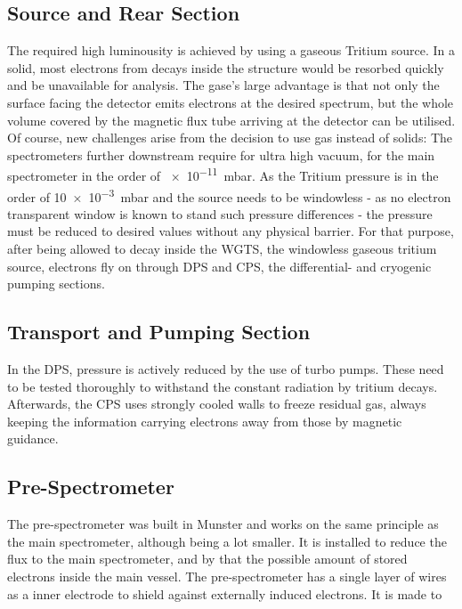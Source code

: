       \subsection{Source and Rear Section}
      \label{ch:The KATRIN experiment:sec:Experimental setup:subsec:sourceSide}
      The required high luminousity is achieved by using a gaseous Tritium source. In a solid, most electrons from decays inside the structure would be resorbed quickly and be unavailable for analysis. The gase's large advantage is that not only the surface facing the detector emits electrons at the desired spectrum, but the whole volume covered by the magnetic flux tube arriving at the detector can be utilised. Of course, new challenges arise from the decision to use gas instead of solids: The spectrometers further downstream require for ultra high vacuum, for the main spectrometer in the order of \SI{e-11}{\milli\bar}. As the Tritium pressure is in the order of \SI{10e-3}{\milli\bar} and the source needs to be windowless - as no electron transparent window is known to stand such pressure differences - the pressure must be reduced to desired values without any physical barrier. 
      For that purpose, after being allowed to decay inside the WGTS, the windowless gaseous tritium source, electrons fly on through DPS and CPS, the differential- and cryogenic pumping sections. 
      \subsection{Transport and Pumping Section}
      
      
      
      In the DPS, pressure is actively reduced by the use of turbo pumps. These need to be tested thoroughly to withstand the constant radiation by tritium decays. Afterwards, the CPS uses strongly cooled walls to freeze residual gas, always keeping the information carrying electrons away from those by magnetic guidance.
      
      \subsection{Pre-Spectrometer}
      \label{ch:The KATRIN experiment:sec:Experimental setup:subsec:PreSpectrometer}
      The pre-spectrometer was built in Munster and works on the same principle as the main spectrometer, although being a lot smaller. It is installed to reduce the flux to the main spectrometer, and by that the possible amount of stored electrons inside the main vessel. The pre-spectrometer has a single layer of wires as a inner electrode to shield against externally induced electrons. It is made to 
